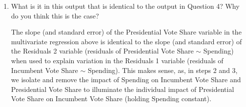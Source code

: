 \documentclass[12pt,letterpaper]{article}
\begin{document}
\begin{enumerate}
\begin{center}
				\vspace{.3cm}
				
				\(\widehat{\texttt{voteshare}} = 0.449 + 0.036\texttt{difflog} + 0.257\texttt{presvote}\)
			\end{center}
		\vspace{.25cm}
		
		In R:\\
		  
		
		\item What is it in this output that is identical to the output in Question 4? Why do you think this is the case?\\
		
		\vspace{.25cm}
		
			The slope (and standard error) of the Presidential Vote Share variable in the multivariate regression above is identical to the slope (and standard error) of the Residuals 2 variable (residuals of Presidential Vote Share $\sim$ Spending) when used to explain variation in the Residuals 1 variable (residuals of Incumbent Vote Share $\sim$ Spending). This makes sense, as, in steps 2 and 3, we isolate and remove the impact of Spending on Incumbent Vote Share and Presidential Vote Share to illuminate the individual impact of Presidential Vote Share on Incumbent Vote Share (holding Spending constant).\\
	\end{enumerate}
\end{document}
